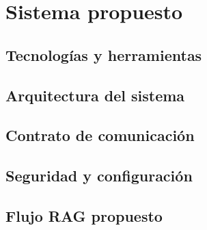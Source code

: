 \section{Sistema propuesto}

\subsection{Tecnologías y herramientas}

\subsection{Arquitectura del sistema}

\subsection{Contrato de comunicación}

\subsection{Seguridad y configuración}

\subsection{Flujo RAG propuesto}
